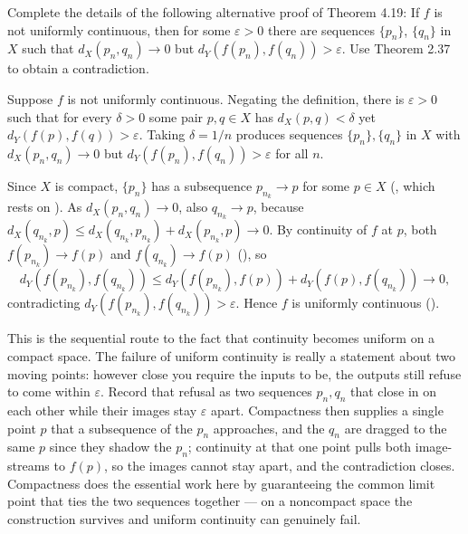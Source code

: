 \documentclass[main.tex]{subfiles}
\begin{document}
Complete the details of the following alternative proof of Theorem 4.19: If $f$ is not uniformly continuous, then for some $\varepsilon > 0$ there are sequences $\{p_{n}\}$, $\{q_{n}\}$ in $X$ such that $d_{X}(p_{n}, q_{n}) \to 0$ but $d_{Y}(f(p_{n}), f(q_{n})) > \varepsilon$. Use Theorem 2.37 to obtain a contradiction.
\begin{SolutionBlue}
Suppose $f$ is not uniformly continuous. Negating the definition, there is $\varepsilon > 0$ such that for every $\delta > 0$ some pair $p, q \in X$ has $d_{X}(p, q) < \delta$ yet $d_{Y}(f(p), f(q)) > \varepsilon$. Taking $\delta = 1/n$ produces sequences $\{p_{n}\}, \{q_{n}\}$ in $X$ with $d_{X}(p_{n}, q_{n}) \to 0$ but $d_{Y}(f(p_{n}), f(q_{n})) > \varepsilon$ for all $n$.

Since $X$ is compact, $\{p_{n}\}$ has a subsequence $p_{n_{k}} \to p$ for some $p \in X$ (, which rests on ). As $d_{X}(p_{n}, q_{n}) \to 0$, also $q_{n_{k}} \to p$, because $d_{X}(q_{n_{k}}, p) \le d_{X}(q_{n_{k}}, p_{n_{k}}) + d_{X}(p_{n_{k}}, p) \to 0$. By continuity of $f$ at $p$, both $f(p_{n_{k}}) \to f(p)$ and $f(q_{n_{k}}) \to f(p)$ (), so
\[
d_{Y}(f(p_{n_{k}}), f(q_{n_{k}})) \le d_{Y}(f(p_{n_{k}}), f(p)) + d_{Y}(f(p), f(q_{n_{k}})) \to 0,
\]
contradicting $d_{Y}(f(p_{n_{k}}), f(q_{n_{k}})) > \varepsilon$. Hence $f$ is uniformly continuous ().
\end{SolutionBlue}
\begin{Reflection}
This is the sequential route to the fact that continuity becomes uniform on a compact space. The failure of uniform continuity is really a statement about two moving points: however close you require the inputs to be, the outputs still refuse to come within $\varepsilon$. Record that refusal as two sequences $p_{n}, q_{n}$ that close in on each other while their images stay $\varepsilon$ apart. Compactness then supplies a single point $p$ that a subsequence of the $p_{n}$ approaches, and the $q_{n}$ are dragged to the same $p$ since they shadow the $p_{n}$; continuity at that one point pulls both image-streams to $f(p)$, so the images cannot stay apart, and the contradiction closes. Compactness does the essential work here by guaranteeing the common limit point that ties the two sequences together --- on a noncompact space the construction survives and uniform continuity can genuinely fail.
\end{Reflection}
\end{document}
